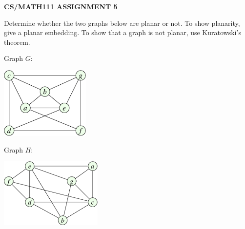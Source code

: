 \documentclass{article}
\begin{document}
\centerline{\large \bf CS/MATH111 ASSIGNMENT 5}


\vskip 0.25in


\begin{problem}
Determine whether the two graphs below are planar or not.
To show planarity, give a planar embedding.
To show that a graph is not planar, use Kuratowski's theorem.

\bigskip

\begin{center}
{\large Graph $G$:\ }
\begin{minipage}{2.1in}
        \includegraphics[width=1.75in]{planar_graphG_hw5.pdf}
\end{minipage}
\hfill
{\large Graph $H$:\ }
\begin{minipage}{2.4in}
        \includegraphics[width=2in]{planar_graphH_hw5.pdf}
\end{minipage}
\end{center}

\bigskip


\end{problem}
\end{document}
